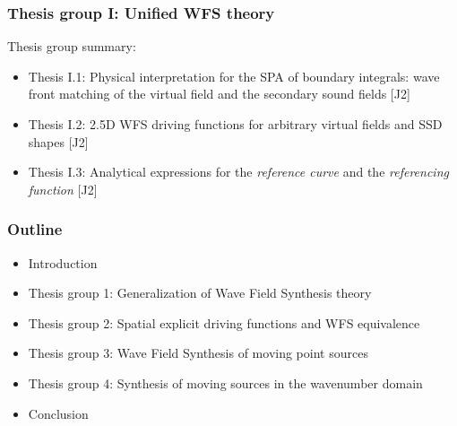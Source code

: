 \documentclass{beamer}
\begin{document}
\begin{frame}
\frametitle{Thesis group I: Unified WFS theory}
Thesis group summary:
	\vspace{3mm}
	\begin{itemize}
	\item Thesis I.1: Physical interpretation for the SPA of boundary integrals: wave front matching of the virtual field and the secondary sound fields [J2]
	\vspace{3mm}
	\item Thesis I.2: 2.5D WFS driving functions for arbitrary virtual fields and SSD shapes [J2]
	\vspace{3mm}
	\item Thesis I.3: Analytical expressions for the \emph{reference curve} and the \emph{referencing function} [J2]
	\end{itemize}
\end{frame}

\begin{frame}
\frametitle{Outline}
\begin{itemize}
	\item Introduction \vspace{3mm}
	\item Thesis group 1: Generalization of Wave Field Synthesis theory \vspace{3mm}
	\item {\color{blue} Thesis group 2: Spatial explicit driving functions and WFS equivalence} \vspace{3mm}
	\item Thesis group 3: Wave Field Synthesis of moving point sources \vspace{3mm}
	\item Thesis group 4: Synthesis of moving sources in the wavenumber domain \vspace{3mm}
	\item Conclusion
\end{itemize}
\end{frame}
\end{document}
